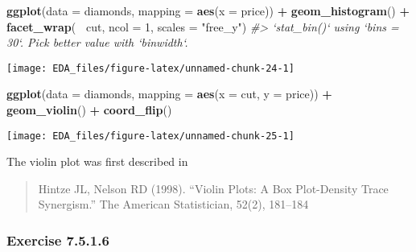 \documentclass[]{book}
\newenvironment{Shaded}{\begin{snugshade}}{\end{snugshade}}
\newcommand{\CommentTok}[1]{\textcolor[rgb]{0.56,0.35,0.01}{\textit{#1}}}
\newcommand{\DataTypeTok}[1]{\textcolor[rgb]{0.13,0.29,0.53}{#1}}
\newcommand{\DecValTok}[1]{\textcolor[rgb]{0.00,0.00,0.81}{#1}}
\newcommand{\KeywordTok}[1]{\textcolor[rgb]{0.13,0.29,0.53}{\textbf{#1}}}
\newcommand{\NormalTok}[1]{#1}
\newcommand{\OperatorTok}[1]{\textcolor[rgb]{0.81,0.36,0.00}{\textbf{#1}}}
\newcommand{\StringTok}[1]{\textcolor[rgb]{0.31,0.60,0.02}{#1}}
\theoremstyle{plain}
\theoremstyle{remark}
\theoremstyle{definition}
\theoremstyle{definition}
\theoremstyle{definition}
\theoremstyle{remark}
\begin{document}
\begin{Shaded}
\begin{Highlighting}[]
\KeywordTok{ggplot}\NormalTok{(}\DataTypeTok{data =}\NormalTok{ diamonds, }\DataTypeTok{mapping =} \KeywordTok{aes}\NormalTok{(}\DataTypeTok{x =}\NormalTok{ price)) }\OperatorTok{+}
\StringTok{  }\KeywordTok{geom_histogram}\NormalTok{() }\OperatorTok{+}
\StringTok{  }\KeywordTok{facet_wrap}\NormalTok{(}\OperatorTok{~}\StringTok{ }\NormalTok{cut, }\DataTypeTok{ncol =} \DecValTok{1}\NormalTok{, }\DataTypeTok{scales =} \StringTok{"free_y"}\NormalTok{)}
\CommentTok{#> `stat_bin()` using `bins = 30`. Pick better value with `binwidth`.}
\end{Highlighting}
\end{Shaded}

\begin{center}\texttt{[image: EDA\_files/figure-latex/unnamed-chunk-24-1]} \end{center}

\begin{Shaded}
\begin{Highlighting}[]
\KeywordTok{ggplot}\NormalTok{(}\DataTypeTok{data =}\NormalTok{ diamonds, }\DataTypeTok{mapping =} \KeywordTok{aes}\NormalTok{(}\DataTypeTok{x =}\NormalTok{ cut, }\DataTypeTok{y =}\NormalTok{ price)) }\OperatorTok{+}
\StringTok{  }\KeywordTok{geom_violin}\NormalTok{() }\OperatorTok{+}
\StringTok{  }\KeywordTok{coord_flip}\NormalTok{()}
\end{Highlighting}
\end{Shaded}

\begin{center}\texttt{[image: EDA\_files/figure-latex/unnamed-chunk-25-1]} \end{center}

The violin plot was first described in

\begin{quote}
Hintze JL, Nelson RD (1998). ``Violin Plots: A Box Plot-Density Trace
Synergism.'' The American Statistician, 52(2), 181--184
\end{quote}

\hypertarget{exercise-7.5.1.6}{%
\subsubsection*{\texorpdfstring{Exercise
{7.5.1.6}}{Exercise 7.5.1.6}}\label{exercise-7.5.1.6}}
\end{document}
